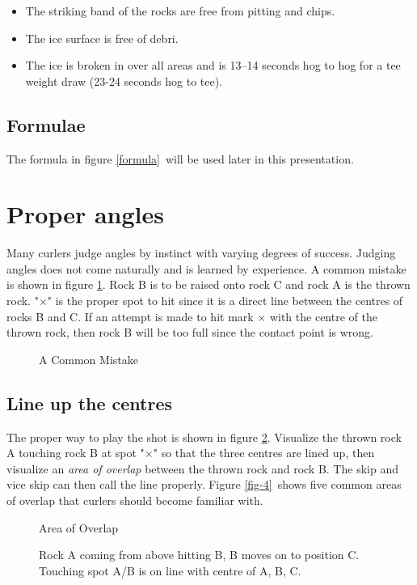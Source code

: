 \documentclass[titlepage,11pt]{article}
\newcommand{\pict}[4]{%
\begin{figure}[htp]%
    \begin{center}%
	{#4}%
    \end{center}%
    \def\boxX{#3}\ifx\boxX\empty
	\caption{\label{#1} #2}%
    \else
	\caption[#3]{\label{#1} #2}%
    \fi
\end{figure}%
}
\newcommand{\picfile}[4]{%
    \pict{#1}{#2}{#3}{}%
}
\newcommand{\prtfloats}{\clearpage}
\begin{document}
\begin{itemize}
\item The striking band of the rocks are free from pitting and chips.
\item The ice surface is free of debri.
\item The ice is broken in over all areas and is 13--14 seconds hog to hog for a
      tee weight draw (23-24 seconds hog to tee).
\end{itemize}

\subsection*{Formulae}

The formula in figure \ref{formula}\ will be used later in this presentation.

\prtfloats

\section{Proper angles}

Many curlers judge angles by instinct with varying degrees of success. Judging
angles does not come naturally and is learned by experience. A common mistake is
shown in figure \ref{fig-2}. Rock B is to be raised onto rock C and rock A is the thrown
rock. "$\times$" is the proper spot to hit since it is a direct line between the
centres of rocks B and C. If an attempt is made to hit mark $\times$ with the centre of
the thrown rock, then rock B will be too full since the contact point is wrong.

\picfile{fig-2}{A Common Mistake}{}{fig02.pic}

\subsection*{Line up the centres}

The proper way to play the shot is shown in figure \ref{fig-3}. Visualize the thrown rock
A touching rock B at spot "$\times$" so that the three centres are lined up, then
visualize an \emph{area of overlap} between the thrown rock and rock B. The skip
and vice skip can then call the line properly. Figure \ref{fig-4}\ shows five common areas
of overlap that curlers should become familiar with.

\picfile{fig-3}{Rock A coming from above hitting B, B moves on to position C.
Touching spot A/B is on line with centre of A, B, C.}{Area of Overlap}{fig03.pic}
\end{document}
